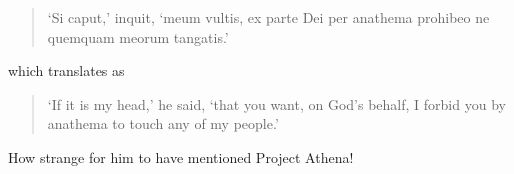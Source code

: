 \begin{quote}
`Si caput,' inquit, `meum vultis, ex parte Dei per anathema prohibeo
ne quemquam meorum tangatis.'
\end{quote}

which translates as 

\begin{quote}
`If it is my head,' he said, `that you want, on God's behalf, I forbid
you by anathema to touch any of my people.'
\end{quote}

How strange for him to have mentioned Project Athena!


